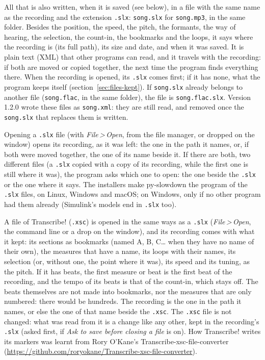 \documentclass[12pt,
              article,
              oneside
              ]{memoir}
\newcommand*{\menu}[1]{\textit{#1}}
\newcommand*{\then}{\,>\,}
\begin{document}
%
All that is also written, when it is saved (see below), in a file with the same
name as the recording and the extension \texttt{.slx}: \texttt{song.slx}
for \texttt{song.mp3}, in the same folder. Besides the position, the speed, the pitch, the formants, the
way of hearing, the selection, the count-in, the bookmarks and the loops,
it says where the recording is (its full path), its size and date, and
when it was saved. It is plain text (XML) that other programs can read, and it
travels with the recording: if both are moved or copied together, the
next time the program finds everything there. When the recording is
opened, its \texttt{.slx} comes first; if it has none, what the program
keeps itself (section~\ref{sec:files-kept}). If \texttt{song.slx} already
belongs to another file (\texttt{song.flac}, in the same folder), the file
is \texttt{song.flac.slx}. Version 1.2.0 wrote these files as
\texttt{song.xml}: they are still read, and removed once the
\texttt{song.slx} that replaces them is written.

%
Opening a \texttt{.slx} file (with \menu{File\then Open}, from the file
manager, or dropped on the window) opens its recording, as it was left:
the one in the path it names, or, if both were moved together, the one of
its name beside it. If there are both, two different files (a
\texttt{.slx} copied with a copy of its recording, while the first one
is still where it was), the program asks which one to open: the one
beside the \texttt{.slx} or the one where it says. The installers make py-slowdown the program of the
\texttt{.slx} files, on Linux, Windows and macOS; on Windows, only if no
other program had them already (Simulink's models end in \texttt{.slx}
too).

%
A file of Transcribe! (\texttt{.xsc}) is opened in the same ways as a
\texttt{.slx} (\menu{File\then Open}, the command line or a drop on the
window), and its recording comes with what it kept: its sections as bookmarks (named A, B,
C\ldots{} when they have no name of their own), the measures that have a
name, its loops with their names, its selection (or, without one, the point
where it was), its speed and its tuning, as the pitch. If it has beats, the
first measure or beat is the first beat of the recording, and the tempo of
its beats is that of the count-in, which stays off. The beats themselves are
not made into bookmarks, nor the measures that are only numbered: there
would be hundreds. The recording is the one in the path it names, or else
the one of that name beside the \texttt{.xsc}. The \texttt{.xsc} file is
not changed: what was read from it is a change like any other, kept in the
recording's \texttt{.slx} (asked first, if \menu{Ask to save before
closing a file} is on). How Transcribe! writes its markers was learnt from
Rory O'Kane's Transcribe-xsc-file-converter
(\url{https://github.com/roryokane/Transcribe-xsc-file-converter}).
\end{document}
